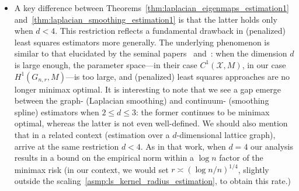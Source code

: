 \documentclass{article}
\newcommand{\1}{\mathbf{1}}
\newcommand{\Xset}{\mathcal{X}}
\theoremstyle{alden}
\theoremstyle{aldenthm}
\theoremstyle{definition}
\theoremstyle{remark}
\begin{document}
\begin{itemize}
	\item A key difference between Theorems~\ref{thm:laplacian_eigenmaps_estimation1} and~\ref{thm:laplacian_smoothing_estimation1} is that the latter holds only when $d < 4$. This restriction reflects a fundamental drawback in (penalized) least squares estimators more generally. The underlying phenomenon is similar to that elucidated by the seminal papers~\cite{birge1993} and~\cite{birge1998}: when the dimension $d$ is large enough, the parameter space---in their case $C^1(\Xset,M)$, in our case $H^1(G_{n,r},M)$---is too large, and (penalized) least squares approaches are no longer minimax optimal. It is interesting to note that we see a gap emerge between the graph- (Laplacian smoothing) and continuum- (smoothing spline) estimators when $2 \leq d \leq 3$: the former continues to be minimax optimal, whereas the latter is not even well-defined. We should also mention that in a related context (estimation over a $d$-dimensional lattice graph), \cite{sadhanala2016} arrive at the same restriction $d < 4$. As in that work, when $d = 4$ our analysis results in a bound on the empirical norm within a $\log n$ factor of the minimax risk (in our context, we would set $r \asymp (\log n/n)^{1/4}$, slightly outside the scaling~\ref{asmp:ls_kernel_radius_estimation}, to obtain this rate.)
\end{itemize}
\end{document}
